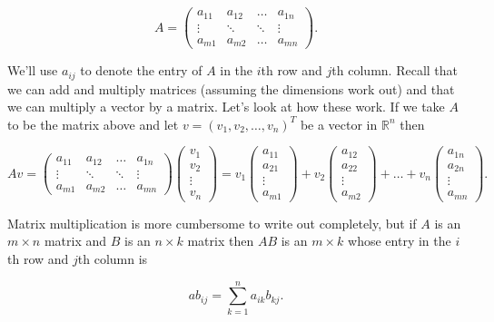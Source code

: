 \documentclass[12pt]{article}
\begin{document}
$$A = 
\begin{pmatrix} 
a_{11} & a_{12} & \ldots & a_{1n} \\
\vdots  & \ddots & \ddots & \vdots \\
a_{m1} & a_{m2} & \ldots & a_{mn}
\end{pmatrix}.$$

We'll use $a_{ij}$ to denote the entry of $A$ in the $i$th row and $j$th column. Recall that we can add and multiply matrices (assuming the dimensions work out) and that we can multiply a vector by a matrix. Let's look at how these work. If we take $A$ to be the matrix above and let $v = (v_1, v_2, \ldots, v_n)^T$ be a vector in $\mathbb{R}^n$ then
 
\[ Av = \begin{pmatrix} 
a_{11} & a_{12} & \ldots & a_{1n} \\
\vdots  & \ddots & \ddots & \vdots \\
a_{m1} & a_{m2} & \ldots & a_{mn}
\end{pmatrix}
%
\begin{pmatrix}
v_1 \\
v_2 \\
\vdots \\
v_n
\end{pmatrix} = 
%
v_1  \begin{pmatrix}
a_{11} \\
a_{21} \\
\vdots \\
a_{m1}
\end{pmatrix} +
%
v_2  \begin{pmatrix}
a_{12} \\
a_{22} \\
\vdots \\
a_{m2}
\end{pmatrix} +
\ldots +
%
v_n  \begin{pmatrix}
a_{1n} \\
a_{2n} \\
\vdots \\
a_{mn}
\end{pmatrix} .\]

Matrix multiplication is more cumbersome to write out completely, but if $A$ is an $m \times n$ matrix and $B$ is an $n \times k$ matrix then $AB$ is an $m \times k$ whose entry in the $i$th row and $j$th column is

$$ab_{ij} = \sum_{k = 1}^n a_{ik}b_{kj}.$$
\end{document}
